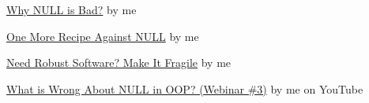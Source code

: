 \documentclass{article}
\begin{document}




\href{https://www.yegor256.com/2014/05/13/why-null-is-bad.html}{Why NULL is Bad?} by me

\href{https://www.yegor256.com/2018/05/22/default-arguments-against-null.html}{One More Recipe Against NULL} by me

\href{https://www.yegor256.com/2015/08/25/fail-fast.html}{Need Robust Software? Make It Fragile} by me

\href{https://www.youtube.com/watch?v=o3aNJX7AP3M}{What is Wrong About NULL in OOP? (Webinar \#3)} by me on YouTube
\end{document}
